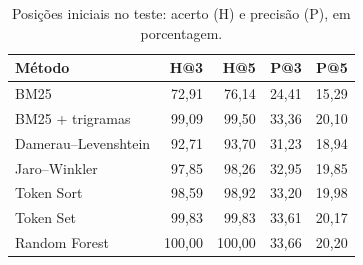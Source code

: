 \begin{table}[tb]
\caption{Posições iniciais no teste: acerto (H) e precisão (P), em porcentagem.}
\label{tab:posicoes}
\centering
\small
\setlength{\tabcolsep}{3pt}
\begin{tabular}{lrrrr}
\toprule
Método & H@3 & H@5 & P@3 & P@5 \\
\midrule
BM25 & 72,91 & 76,14 & 24,41 & 15,29 \\
BM25 + trigramas & 99,09 & 99,50 & 33,36 & 20,10 \\
Damerau--Levenshtein & 92,71 & 93,70 & 31,23 & 18,94 \\
Jaro--Winkler & 97,85 & 98,26 & 32,95 & 19,85 \\
Token Sort & 98,59 & 98,92 & 33,20 & 19,98 \\
Token Set & 99,83 & 99,83 & 33,61 & 20,17 \\
Random Forest & 100,00 & 100,00 & 33,66 & 20,20 \\
\bottomrule
\end{tabular}

\end{table}
